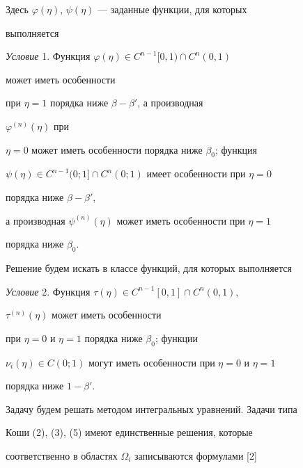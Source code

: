 Здесь $\varphi(\eta)$, $\psi(\eta)$ --- заданные функции, для которых 


выполняется 


\medskip 


 


{\it Условие} 1. Функция $\varphi(\eta)\in C^{n-1}[0,1)\cap C^n(0,1)$ 


может иметь особенности 


при $\eta=1$ порядка ниже $\beta-\beta'$, а производная 


$\varphi^{(n)}(\eta)$ при 


$\eta=0$ может иметь особенности порядка ниже $\beta_0$; функция 


$\psi(\eta)\in C^{n-1}(0;1]\cap C^n(0;1)$ имеет особенности при $\eta=0$ 


порядка ниже $\beta-\beta'$, 


а производная $\psi^{(n)}(\eta)$ может иметь особенности при $\eta=1$ 


порядка ниже $\beta_0$. 


\medskip 


 


Решение будем искать в классе функций, для которых выполняется 


\medskip 


 


{\it Условие} 2. Функция $\tau(\eta)\in C^{n-1}[0,1]\cap C^n(0,1)$, 


$\tau^{(n)}(\eta)$ может иметь особенности 


при $\eta=0$ и $\eta=1$ порядка ниже $\beta_0$; функции 


$\nu_i(\eta)\in C(0;1)$ могут иметь особенности при $\eta=0$ и $\eta=1$ 


порядка ниже $1-\beta'$. 


\medskip 


 


Задачу будем решать методом интегральных уравнений. Задачи типа 


Коши (2), (3), (5) имеют единственные решения, которые 


соответственно в областях $\Omega_i$ записываются формулами [2] 


